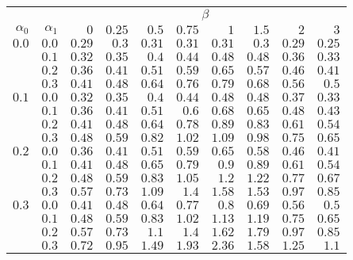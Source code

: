 \begin{tabular}{rr|rrrrrrrr}
\hline\hline
 && \multicolumn{8}{c}{$\beta$}\\
 $\alpha_0$ & $\alpha_1$ & $0$ & $0.25$ & $0.5$ & $0.75$ & $1$ & $1.5$ & $2$ & $3$ \\ 
 \hline
$0.0$ & $0.0$ & $0.29$ & $0.3$ & $0.31$ & $0.31$ & $0.31$ & $0.3$ & $0.29$ & $0.25$\\ 
 & $0.1$ & $0.32$ & $0.35$ & $0.4$ & $0.44$ & $0.48$ & $0.48$ & $0.36$ & $0.33$\\ 
 & $0.2$ & $0.36$ & $0.41$ & $0.51$ & $0.59$ & $0.65$ & $0.57$ & $0.46$ & $0.41$\\ 
 & $0.3$ & $0.41$ & $0.48$ & $0.64$ & $0.76$ & $0.79$ & $0.68$ & $0.56$ & $0.5$\\ 
\hline 
 $0.1$ & $0.0$ & $0.32$ & $0.35$ & $0.4$ & $0.44$ & $0.48$ & $0.48$ & $0.37$ & $0.33$\\ 
 & $0.1$ & $0.36$ & $0.41$ & $0.51$ & $0.6$ & $0.68$ & $0.65$ & $0.48$ & $0.43$\\ 
 & $0.2$ & $0.41$ & $0.48$ & $0.64$ & $0.78$ & $0.89$ & $0.83$ & $0.61$ & $0.54$\\ 
 & $0.3$ & $0.48$ & $0.59$ & $0.82$ & $1.02$ & $1.09$ & $0.98$ & $0.75$ & $0.65$\\ 
\hline 
 $0.2$ & $0.0$ & $0.36$ & $0.41$ & $0.51$ & $0.59$ & $0.65$ & $0.58$ & $0.46$ & $0.41$\\ 
 & $0.1$ & $0.41$ & $0.48$ & $0.65$ & $0.79$ & $0.9$ & $0.89$ & $0.61$ & $0.54$\\ 
 & $0.2$ & $0.48$ & $0.59$ & $0.83$ & $1.05$ & $1.2$ & $1.22$ & $0.77$ & $0.67$\\ 
 & $0.3$ & $0.57$ & $0.73$ & $1.09$ & $1.4$ & $1.58$ & $1.53$ & $0.97$ & $0.85$\\ 
\hline 
 $0.3$ & $0.0$ & $0.41$ & $0.48$ & $0.64$ & $0.77$ & $0.8$ & $0.69$ & $0.56$ & $0.5$\\ 
 & $0.1$ & $0.48$ & $0.59$ & $0.83$ & $1.02$ & $1.13$ & $1.19$ & $0.75$ & $0.65$\\ 
 & $0.2$ & $0.57$ & $0.73$ & $1.1$ & $1.4$ & $1.62$ & $1.79$ & $0.97$ & $0.85$\\ 
 & $0.3$ & $0.72$ & $0.95$ & $1.49$ & $1.93$ & $2.36$ & $1.58$ & $1.25$ & $1.1$\\ 
 \hline 
 \end{tabular}